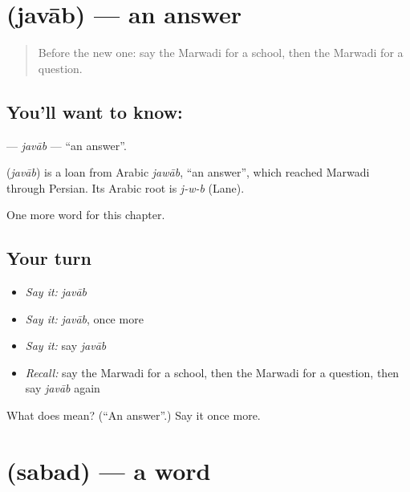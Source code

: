\section[\texorpdfstring{\mw{जवाब} (javāb)}{जवाब (javāb)}]{ (javāb) — an answer}

\label{lesson:MW-C66-javab}



\begin{quote}
Before the new one: say the Marwadi for a school, then the Marwadi for a question.
\end{quote}

\subsection*{You'll want to know: }
\textbf{} — \emph{javāb} — \textquotedblleft{}an answer\textquotedblright{}.

\begin{cousinweb}
\textbf{} (\emph{javāb}) is a loan from Arabic \emph{jawāb}, \textquotedblleft{}an answer\textquotedblright{}, which reached Marwadi through Persian. Its Arabic root is \emph{j-w-b} (Lane).
\end{cousinweb}

\begin{grammarlens}[title={What you've built}]
One more word for this chapter.
\end{grammarlens}

\subsection*{Your turn}
\begin{itemize}
\raggedright
  \item \emph{Say it:} \emph{javāb}
  \item \emph{Say it:} \emph{javāb}, once more
  \item \emph{Say it:} say \emph{javāb}
  \item \emph{Recall:} say the Marwadi for a school, then the Marwadi for a question, then say \emph{javāb} again
\end{itemize}

\begin{tcolorbox}[breakable,colback=teal!4,colframe=teal!35!black,title={Before you move on}]
What does  mean? (\textquotedblleft{}An answer\textquotedblright{}.) Say it once more.
\end{tcolorbox}
\section[\texorpdfstring{\mw{सबद} (sabad)}{सबद (sabad)}]{ (sabad) — a word}

